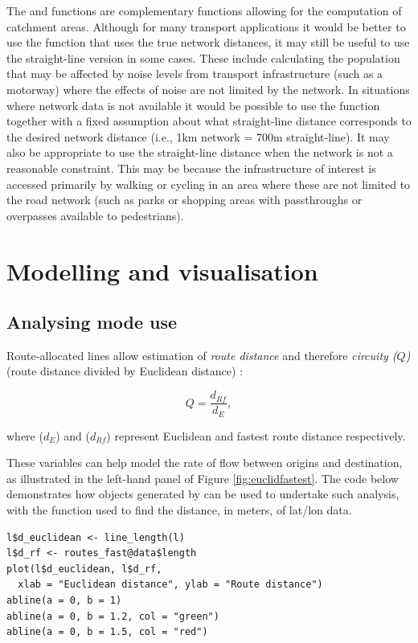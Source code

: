 The  and 
functions are complementary functions allowing for the computation of catchment areas.
Although for many transport applications it would be better to use the  function that uses the true network distances, it may still be useful to use the straight-line version in some cases.
These include calculating the population that may be affected by noise levels from transport infrastructure (such as a motorway) where the effects of noise are not limited by the network.
In situations where network data is not available it would be possible to use the  function together with a fixed assumption about what straight-line distance corresponds to the desired network distance (i.e., 1km network = 700m straight-line).
It may also be appropriate to use the straight-line distance when the network is not a reasonable constraint.
This may be because the infrastructure of interest is accessed primarily by walking or cycling in an area where these are not limited to the road network (such as parks or shopping areas with passthroughs or overpasses available to pedestrians).

\section{Modelling and visualisation}\label{modelling-and-visualisation}

\subsection{Analysing mode use}\label{modelling-mode-choice}

Route-allocated lines allow estimation of \emph{route distance} and therefore
\emph{circuity ($Q$)} (route distance divided by Euclidean distance)
\citep{levinson_minimum_2009}:

\[
 Q = \frac{d_{Rf}}{d_E},
\]

where (\(d_E\)) and (\(d_{Rf}\)) represent
Euclidean and fastest route distance respectively.

These
variables can help model the rate of flow between origins and
destination, as illustrated in the left-hand panel of Figure
\ref{fig:euclidfastest}. The code below demonstrates how objects
generated by  can be used to undertake such analysis,
with the  function used to find the distance, in
meters, of lat/lon data.

\begin{verbatim}
l$d_euclidean <- line_length(l)
l$d_rf <- routes_fast@data$length
plot(l$d_euclidean, l$d_rf,
  xlab = "Euclidean distance", ylab = "Route distance")
abline(a = 0, b = 1)
abline(a = 0, b = 1.2, col = "green")
abline(a = 0, b = 1.5, col = "red")
\end{verbatim}

